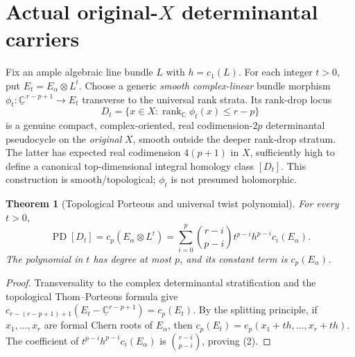 \documentclass[11pt]{article}
\newtheorem{theorem}{Theorem}[section]
\newcommand{\rk}{\operatorname{rank}}
\newcommand{\PD}{\operatorname{PD}}
\begin{document}
\section{Actual original-\(X\) determinantal carriers}
Fix an ample algebraic line bundle \(L\) with \(h=c_1(L)\). For each integer \(t>0\), put \(E_t=E_\alpha\otimes L^t\). Choose a generic \emph{smooth complex-linear} bundle morphism \(\phi_t:\underline{\mathbb C}^{\,r-p+1}\longrightarrow E_t\) transverse to the universal rank strata. Its rank-drop locus
\[
D_t=\{x\in X:\rk_{\mathbb C}\phi_t(x)\le r-p\}
\]
is a genuine compact, complex-oriented, real codimension-\(2p\) determinantal pseudocycle on the \emph{original} \(X\), smooth outside the deeper rank-drop stratum. The latter has expected real codimension \(4(p+1)\) in \(X\), sufficiently high to define a canonical top-dimensional integral homology class \([D_t]\). This construction is smooth/topological; \(\phi_t\) is not presumed holomorphic.

\begin{theorem}[Topological Porteous and universal twist polynomial]
For every \(t>0\),
\[
\boxed{\PD[D_t]=c_p(E_\alpha\otimes L^t)
=\sum_{i=0}^p {r-i\choose p-i}t^{p-i}h^{p-i}c_i(E_\alpha).}\tag{2}
\]
The polynomial in \(t\) has degree at most \(p\), and its constant term is \(c_p(E_\alpha)\).
\end{theorem}
\begin{proof}
Transversality to the complex determinantal stratification and the topological Thom--Porteous formula give \(c_{r-(r-p+1)+1}(E_t-\underline{\mathbb C}^{r-p+1})=c_p(E_t)\). By the splitting principle, if \(x_1,\ldots,x_r\) are formal Chern roots of \(E_\alpha\), then \(c_p(E_t)=e_p(x_1+th,\ldots,x_r+th)\). The coefficient of \(t^{p-i}h^{p-i}c_i(E_\alpha)\) is \(\binom{r-i}{p-i}\), proving (2).
\end{proof}
\end{document}
